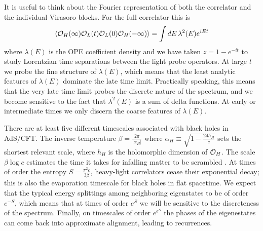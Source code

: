 \documentclass[12pt]{article}
\numberwithin{equation}{section}
\def\>{\rangle}
\def\<{\langle}
\newcommand{\be}{\begin{eqnarray}}
\newcommand{\ee}{\end{eqnarray}}
\newcommand{\CO}{{\cal O}}
\newcommand{\blue}{\bf\color{blue}}
\begin{document}
It is useful to think about the Fourier representation of both the correlator and the individual Virasoro blocks.  For the full correlator this is
\be
\< \CO_H(\infty) \CO_L(t) \CO_L(0) \CO_H(-\infty) \> = \int d E \,  \lambda^2(E) e^{i E t}
\ee
where $\lambda(E)$ is the OPE coefficient density and we have taken $z = 1 - e^{-it}$ to study Lorentzian time separations between the light probe operators.  At large $t$ we probe the fine structure of $\lambda(E)$, which means that the least analytic features of $\lambda(E)$ dominate the late time limit.  Practically speaking, this means that the very late time limit probes the discrete nature of the spectrum, and we become sensitive to the fact that $\lambda^2(E)$ is a sum of delta functions.  At early or intermediate times we only discern the coarse features of $\lambda(E)$.  

There are at least five different timescales associated with black holes in AdS/CFT.  The inverse temperature $\beta = \frac{2 \pi}{|\alpha_H|}$ where $\alpha_H \equiv \sqrt{1- \frac{24 h_H}{c}}$  sets the shortest relevant scale, where $h_H$ is the holomorphic dimension of $\CO_H$.  The scale $\beta \log c$ estimates the time it takes for infalling matter to be scrambled \cite{Hayden:2007cs, Maldacena:2015waa}.  At times of order the entropy $S = \frac{\pi^2 c}{3 \beta}$, heavy-light correlators cease their exponential decay; this is also the evaporation timescale for black holes in flat spacetime.  We expect that the typical energy splittings among neighboring eigenstates to be of order $e^{-S}$, which means that at times of order $e^S$ we will be sensitive to the discreteness of the spectrum.  Finally, on timescales of order $e^{e^S}$ the phases of the eigenestates can come back into approximate alignment, leading to recurrences.   


\end{document}
